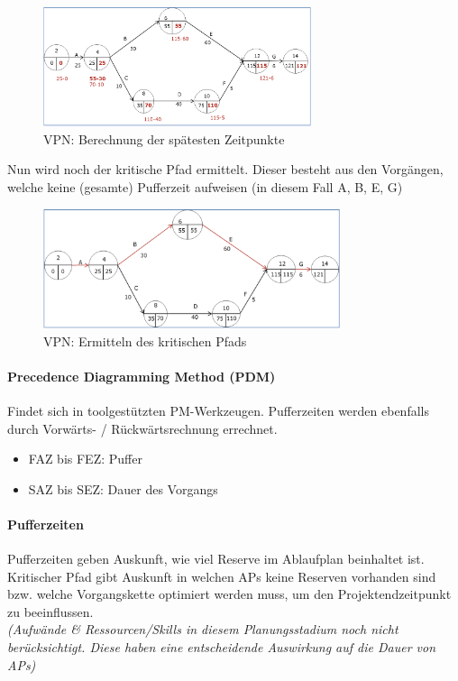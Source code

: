 \documentclass[a4paper]{article}
\begin{document}
			\begin{figure}[!htb]
				\centering
				\includegraphics[height=3.5cm]{img/pm/cpm_latest.png}
				\caption{VPN: Berechnung der spätesten Zeitpunkte}
				\label{fig:pm_cpm_latest}
			\end{figure}
			\noindent
			Nun wird noch der kritische Pfad ermittelt.
			Dieser besteht aus den Vorgängen, welche keine (gesamte) Pufferzeit aufweisen (in diesem Fall A, B, E, G)
			
			\begin{figure}[!htb]
				\centering
				\includegraphics[height=3.5cm]{img/pm/cpm_critical.png}
				\caption{VPN: Ermitteln des kritischen Pfads}
				\label{fig:pm_cpm_critical}
			\end{figure}
		
\newpage

			\paragraph{Precedence Diagramming Method (PDM)}
			
			Findet sich in toolgestützten PM-Werkzeugen.
			Pufferzeiten werden ebenfalls durch Vorwärts- / Rückwärtsrechnung errechnet.
			
			\begin{itemize}
				\item FAZ bis FEZ: Puffer
				\item SAZ bis SEZ: Dauer des Vorgangs
			\end{itemize}
		
			\paragraph{Pufferzeiten}
			
			Pufferzeiten geben Auskunft, wie viel Reserve im Ablaufplan beinhaltet ist.
			Kritischer Pfad gibt Auskunft in welchen APs keine Reserven vorhanden sind bzw. welche Vorgangskette optimiert werden muss, um den Projektendzeitpunkt zu beeinflussen.\\
			\textit{(Aufwände \& Ressourcen/Skills in diesem Planungsstadium noch nicht berücksichtigt.
			Diese haben eine entscheidende Auswirkung auf die Dauer von APs)}
		
\end{document}
